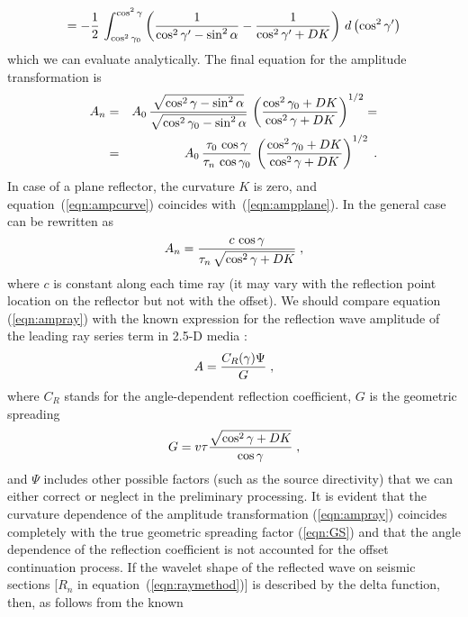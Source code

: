 \begin{equation}
 = -{1 \over 2}\,\int_{\cos^2{\gamma_0}}^{\cos^2{\gamma}}
\left({1 \over {\cos^2{\gamma'}-\sin^2{\alpha}}}-
{1 \over
{\cos^2{\gamma'}+DK}}\right)\,d\left(\cos^2{\gamma'}\right) 
\label{eqn:int2g}
\end{equation}
which we can evaluate analytically. The final equation for the
amplitude transformation is
\begin{eqnarray}
A_n & = & A_0\,{\sqrt{\cos^2{\gamma}-\sin^2{\alpha}}\over
\sqrt{\cos^2{\gamma_0}-\sin^2{\alpha}}}\,\left(
{\cos^2{\gamma_0}+DK}\over{\cos^2{\gamma}+DK}\right)^{1/2}=
\nonumber \\
& = & A_0\,{{\tau_0\,\cos{\gamma}}\over{\tau_n\,\cos{\gamma_0}}}\,
\left(
{\cos^2{\gamma_0}+DK}\over{\cos^2{\gamma}+DK}\right)^{1/2}\;. 
\label{eqn:ampcurve}
\end{eqnarray}
In case of a plane reflector, the curvature $K$ is zero, and
equation~(\ref{eqn:ampcurve}) coincides with~(\ref{eqn:ampplane}).
In the general case can be rewritten as
\begin{equation}
A_n={{c\,\cos{\gamma}}\over{\tau_n\,\sqrt{\cos^2{\gamma}+DK}}}\;,
\label{eqn:ampray}
\end{equation}
where $c$ is constant along each time ray (it may vary with the reflection point
location on the reflector but not with the offset). We should compare equation
(\ref{eqn:ampray}) 
with the known expression for the reflection wave amplitude of the leading
ray series term in 2.5-D media \cite[]{cwp}:
\begin{equation}
A={{C_R(\gamma) \Psi}\over G}\;,
\label{eqn:amptrue}
\end{equation}
where $C_R$ stands for the angle-dependent reflection coefficient, $G$ is the
geometric spreading
\begin{equation}
G=v \tau {\sqrt{\cos^2{\gamma}+DK}\over \cos{\gamma}}\;,
\label{eqn:GS}
\end{equation}
and $\Psi$ includes other possible factors (such as the source
directivity) that we can either correct or neglect in the preliminary
processing.  It is evident that the curvature dependence of the
amplitude transformation (\ref{eqn:ampray}) coincides completely with
the true geometric spreading factor (\ref{eqn:GS}) and that the angle
dependence of the reflection coefficient is not accounted for the offset
continuation process. If the wavelet shape of the reflected wave on
seismic sections [$R_n$ in equation~(\ref{eqn:raymethod})] is
described by the delta function, then, as follows from the known
